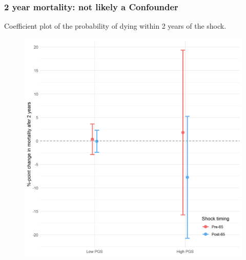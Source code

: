 \documentclass[10pt,compress,xcolor=dvipsnames,aspectratio=169]{beamer}    %
\newcounter{ex}
\newcommand{\1}[1]{\mathrm{1\hspace*{-2.5pt}l}[#1]}	%
\begin{document}
\begin{frame}
\frametitle{2 year mortality: not likely a Confounder}
Coefficient plot of the probability of dying within 2 years of the shock.
\begin{figure}[hbtp]
\centering
\includegraphics[height=0.8\textheight]{../../3_output/shock_effects/dead2_6070_100_cv.png}
\label{fig:dead2}
\end{figure}
\end{frame}
\end{document}
